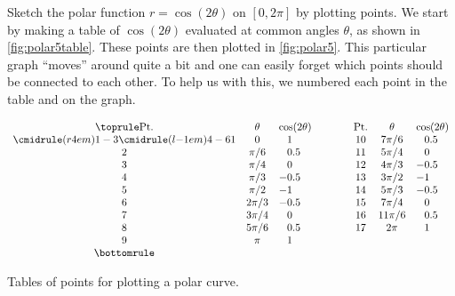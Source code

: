 \begin{example}\label{ex_polar5}
Sketch the polar function $r=\cos (2\theta)$ on $[0,2\pi]$ by plotting points.
\solution
We start by making a table of $\cos (2\theta)$ evaluated at common angles $\theta$, as shown in \autoref{fig:polar5table}. These points are then plotted in \autoref{fig:polar5}. This particular graph ``moves'' around quite a bit and one can easily forget which points should be connected to each other. To help us with this, we numbered each point in the table and on the graph. 

{\centering
\captionsetup{type=figure}%
$\begin{array}{ccl @{\hspace{4em}} ccl}\toprule
\text{Pt.} & \theta & \cos (2\theta) & \text{Pt.} & \theta & \cos (2\theta) \\
 \cmidrule(r{4em}){1-3}\cmidrule(l{-1em}){4-6}
 1 & 0 & \phantom{-}1 & 10 & 7 \pi /6 & \phantom{-}0.5 \\
 2 & \pi /6 & \phantom{-}0.5 & 11 & 5 \pi /4 & \phantom{-}0 \\
 3 & \pi /4 & \phantom{-}0 & 12 & 4 \pi /3 & -0.5 \\
 4 & \pi /3 & -0.5 & 13 & 3 \pi /2 & -1 \\
 5 & \pi /2 & -1 & 14 & 5 \pi /3 & -0.5 \\
 6 & 2 \pi /3 & -0.5 & 15 & 7 \pi /4 & \phantom{-}0 \\
 7 & 3 \pi /4 & \phantom{-}0 & 16 & 11 \pi /6 & \phantom{-}0.5 \\
 8 & 5 \pi /6 & \phantom{-}0.5 & 17 & 2 \pi & \phantom{-}1 \\
 9 & \pi  & \phantom{-}1 \\\bottomrule
\end{array}$
\caption{Tables of points for plotting a polar curve.}
\label{fig:polar5table}
}%



\end{example}
